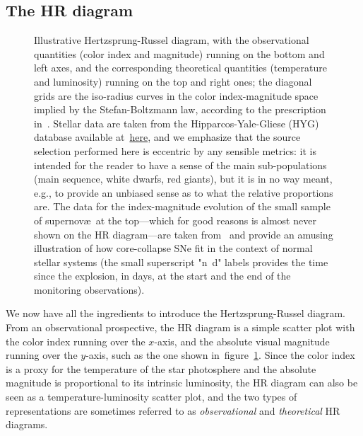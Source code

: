 \subsection{The HR diagram}
\label{sec:stars_hr}

\begin{figure}[!tbp]
  
  \caption{Illustrative Hertzsprung-Russel diagram, with the observational quantities
    (color index and magnitude) running on the bottom and left axes, and the
    corresponding theoretical quantities (temperature and luminosity) running on
    the top and right ones; the diagonal grids are the iso-radius curves in the
    color index-magnitude space implied by the Stefan-Boltzmann law, according to
    the prescription in~\cite{1998JRASC..92...36R}. Stellar data
    are taken from the Hipparcos-Yale-Gliese (HYG) database available
    at~\href{https://github.com/astronexus/HYG-Database}{here}, and we emphasize
    that the source selection performed here is eccentric by any sensible metrics:
    it is intended for the reader to have a sense of the main sub-populations
    (main sequence, white dwarfs, red giants), but it is in no way meant, e.g.,
    to provide an unbiased sense as to what the relative proportions are.
    The data for the index-magnitude evolution of the small sample of supernov\ae\
    at the top---which for good reasons is almost never shown on the HR diagram---are
    taken from~\cite{2018MNRAS.473..513F} and provide an amusing illustration
    of how core-collapse SNe fit in the context of normal stellar systems
    (the small superscript "n~d" labels provides the time since the explosion,
    in days, at the start and the end of the monitoring observations).}
  \label{fig:hr}
\end{figure}

We now have all the ingredients to introduce the Hertzsprung-Russel diagram.
From an observational prospective, the HR diagram is a simple scatter plot with
the color index running over the $x$-axis, and the absolute visual magnitude running
over the $y$-axis, such as the one shown in~figure~\ref{fig:hr}.
Since the color index is a proxy for the temperature of the star photosphere
and the absolute magnitude is proportional to its intrinsic luminosity, the HR
diagram can also be seen as a temperature-luminosity scatter plot, and the two
types of representations are sometimes referred to as \emph{observational} and
\emph{theoretical} HR diagrams.

